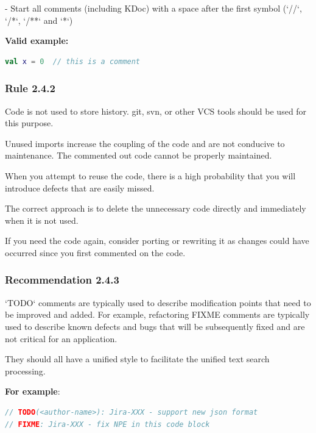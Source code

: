 - Start all comments (including KDoc) with a space after the first symbol (`//`, `/*`, `/**` and `*`)



\textbf{Valid example:}

\begin{lstlisting}[language=Kotlin]
val x = 0  // this is a comment
\end{lstlisting}


\subsubsection*{\textbf{Rule 2.4.2}}
\leavevmode\newline



Code is not used to store history. git, svn, or other VCS tools should be used for this purpose.

Unused imports increase the coupling of the code and are not conducive to maintenance. The commented out code cannot be properly maintained.

When you attempt to reuse the code, there is a high probability that you will introduce defects that are easily missed.

The correct approach is to delete the unnecessary code directly and immediately when it is not used.

If you need the code again, consider porting or rewriting it as changes could have occurred since you first commented on the code. 



\subsubsection*{\textbf{Recommendation 2.4.3}}
\leavevmode\newline



`TODO` comments are typically used to describe modification points that need to be improved and added. For example, refactoring FIXME comments are typically used to describe known defects and bugs that will be subsequently fixed and are not critical for an application.

They should all have a unified style to facilitate the unified text search processing.



\textbf{For example}:

\begin{lstlisting}[language=Kotlin]
// TODO(<author-name>): Jira-XXX - support new json format
// FIXME: Jira-XXX - fix NPE in this code block
\end{lstlisting}


